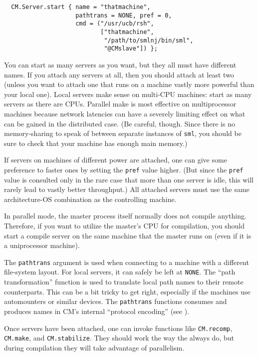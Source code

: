\begin{lstlisting}
  CM.Server.start { name = "thatmachine",
                    pathtrans = NONE, pref = 0,
                    cmd = ("/usr/ucb/rsh",
                           ["thatmachine",
                            "/path/to/smlnj/bin/sml",
                            "@CMslave"]) };
\end{lstlisting}%

You can start as many servers as you want, but they all must have
different names.  If you attach any servers at all, then you should
attach at least two (unless you want to attach one that runs on a
machine vastly more powerful than your local one).  Local servers make
sense on multi-CPU machines: start as many servers as there are CPUs.
Parallel make is most effective on multiprocessor machines because
network latencies can have a severely limiting effect on what can be
gained in the distributed case.
(Be careful, though.  Since there is no memory-sharing to speak of
between separate instances of {\tt sml}, you should be sure to check
that your machine has enough main memory.)

If servers on machines of different power are attached, one can give
some preference to faster ones by setting the {\tt pref} value higher.
(But since the {\tt pref} value is consulted only in the rare case
that more than one server is idle, this will rarely lead to vastly
better throughput.) All attached servers must use the same
architecture-OS combination as the controlling machine.

In parallel mode, the master process itself normally does not compile
anything.  Therefore, if you want to utilize the master's CPU for
compilation, you should start a compile server on the same machine
that the master runs on (even if it is a uniprocessor machine).

The {\tt pathtrans} argument is used when connecting to a machine with
a different file-system layout.  For local servers, it can safely be
left at {\tt NONE}.  The ``path transformation'' function is used to
translate local path names to their remote counterparts.  This can be
a bit tricky to get right, especially if the machines use automounters
or similar devices.  The {\tt pathtrans} functions consumes and
produces names in CM's internal ``protocol encoding'' (see
).

Once servers have been attached, one can invoke functions like
{\tt CM.recomp}, {\tt CM.make}, and {\tt CM.stabilize}.  They should
work the way the always do, but during compilation they will take
advantage of parallelism.


